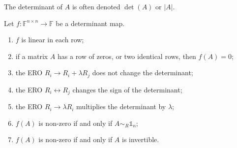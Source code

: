 The determinant of $A$ is often denoted $\det(A)$ or $|A|$.

\begin{lemma}
Let $f: \mathbb{F}^{n\times n}\to \mathbb{F}$ be a determinant map.
\begin{enumerate}
\item $f$ is linear in each row;
\item if a matrix $A$ has a row of zeros, or two identical rows, then $f(A) = 0$;
\item the ERO $R_i \to R_i+ \lambda R_j$ does not change the determinant;
\item the ERO $R_i \leftrightarrow R_j$ changes the sign of the determinant;
\item the ERO $R_i \to \lambda R_i$ multiplies the determinant by $\lambda$;
\item $f(A)$ is non-zero \textup{if and only if} $A\sim_R \mathbb{1}_n$;
\item $f(A)$ is non-zero \textup{if and only if} $A$ is invertible.
\end{enumerate}
\end{lemma}


